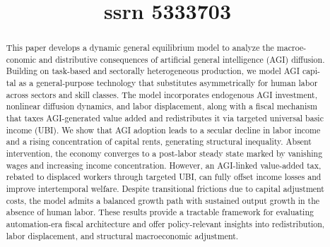 \title{ssrn 5333703}

\maketitle

\begin{abstract}
This paper develops a dynamic general equilibrium model to analyze the macroe- conomic and distributive consequences of artificial general intelligence (AGI) diffusion. Building on task-based and sectorally heterogeneous production, we model AGI capi- tal as a general-purpose technology that substitutes asymmetrically for human labor across sectors and skill classes. The model incorporates endogenous AGI investment, nonlinear diffusion dynamics, and labor displacement, along with a fiscal mechanism that taxes AGI-generated value added and redistributes it via targeted universal basic income (UBI). We show that AGI adoption leads to a secular decline in labor income and a rising concentration of capital rents, generating structural inequality. Absent intervention, the economy converges to a post-labor steady state marked by vanishing wages and increasing income concentration. However, an AGI-linked value-added tax, rebated to displaced workers through targeted UBI, can fully offset income losses and improve intertemporal welfare. Despite transitional frictions due to capital adjustment costs, the model admits a balanced growth path with sustained output growth in the absence of human labor. These results provide a tractable framework for evaluating automation-era fiscal architecture and offer policy-relevant insights into redistribution, labor displacement, and structural macroeconomic adjustment.
\end{abstract}

